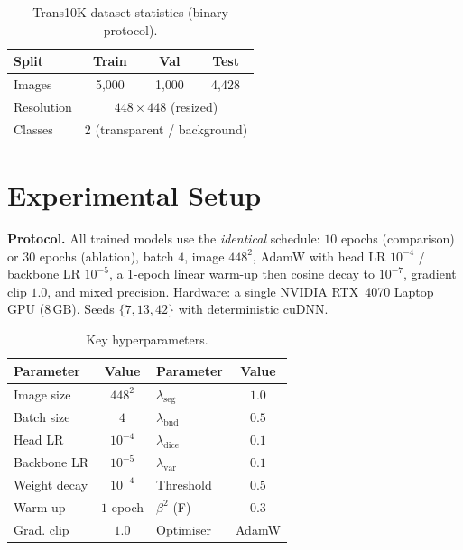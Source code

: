 \documentclass{article}
\begin{document}
\begin{table}[t]
\centering
\caption{Trans10K dataset statistics (binary protocol).}
\label{tab:data}
\begin{tabular}{lccc}
\toprule
Split & Train & Val & Test \\
\midrule
Images & 5{,}000 & 1{,}000 & 4{,}428 \\
Resolution & \multicolumn{3}{c}{$448\times448$ (resized)} \\
Classes & \multicolumn{3}{c}{2 (transparent / background)} \\
\bottomrule
\end{tabular}
\end{table}

\section{Experimental Setup}
\textbf{Protocol.} All trained models use the \emph{identical} schedule: $10$
epochs (comparison) or $30$ epochs (ablation), batch $4$, image $448^2$, AdamW
\cite{loshchilov2019adamw} with head LR $10^{-4}$ / backbone LR $10^{-5}$, a
1-epoch linear warm-up then cosine decay \cite{loshchilov2017sgdr} to $10^{-7}$,
gradient clip $1.0$, and mixed precision. Hardware: a single NVIDIA RTX~4070
Laptop GPU (8\,GB). Seeds $\{7,13,42\}$ with deterministic cuDNN.

\begin{table}[t]
\centering
\caption{Key hyperparameters.}
\label{tab:hparams}
\begin{tabular}{lc@{\hskip 1.4em}lc}
\toprule
Parameter & Value & Parameter & Value \\
\midrule
Image size & $448^2$ & $\lambda_{\mathrm{seg}}$ & $1.0$ \\
Batch size & $4$ & $\lambda_{\mathrm{bnd}}$ & $0.5$ \\
Head LR & $10^{-4}$ & $\lambda_{\mathrm{dice}}$ & $0.1$ \\
Backbone LR & $10^{-5}$ & $\lambda_{\mathrm{var}}$ & $0.1$ \\
Weight decay & $10^{-4}$ & Threshold & $0.5$ \\
Warm-up & $1$ epoch & $\beta^2$ (F) & $0.3$ \\
Grad. clip & $1.0$ & Optimiser & AdamW \\
\bottomrule
\end{tabular}
\end{table}
\end{document}
